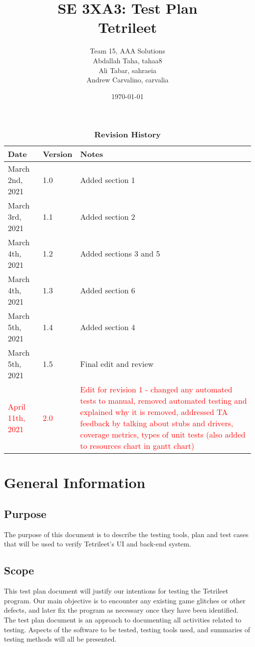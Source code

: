 \documentclass[12pt, titlepage]{article}
\title{SE 3XA3: Test Plan\\Tetrileet}
\author{Team 15, AAA Solutions
		\\ Abdallah Taha, tahaa8
		\\ Ali Tabar, sahraeia
		\\ Andrew Carvalino, carvalia
}
\date{\today}
\begin{document}
\maketitle

\tableofcontents
\listoftables
\listoffigures
\newpage
\begin{table}[h!]
\caption{\bf Revision History}
\begin{tabularx}{\textwidth}{p{3cm}p{2cm}X}
\toprule {\bf Date} & {\bf Version} & {\bf Notes}\\
\midrule
March 2nd, 2021 & 1.0 & Added section 1\\
March 3rd, 2021 & 1.1 & Added section 2\\
March 4th, 2021 & 1.2 & Added sections 3 and 5\\
March 4th, 2021 & 1.3 & Added section 6\\
March 5th, 2021 & 1.4 & Added section 4\\
March 5th, 2021 & 1.5 & Final edit and review\\
\textcolor{red}{April 11th, 2021} &\textcolor{red}{2.0} & \textcolor{red}{Edit for revision 1 - changed any automated tests to manual, removed automated testing and explained why it is removed, addressed TA feedback by talking about stubs and drivers, coverage metrics, types of unit tests (also added to resources chart in gantt chart)}\\
\bottomrule
\end{tabularx}
\end{table}

\newpage


\section{General Information}

\subsection{Purpose}
The purpose of this document is to describe the testing tools, plan and test cases that will be used to verify Tetrileet's UI and back-end system.
\subsection{Scope}
This test plan document will justify our intentions for testing the Tetrileet program. Our main objective is to encounter any existing game glitches or other defects, and later fix the program as necessary once they have been identified.\\
The test plan document is an approach to documenting all activities related to testing. 
Aspects of the software to be tested, testing tools used, and summaries of testing methods will all be presented. 
\end{document}
